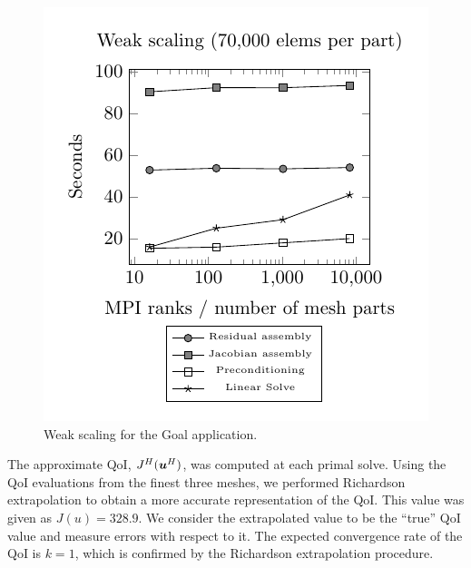 \begin{figure}[ht!]
\centering
\includegraphics[width=0.5\linewidth]{img/aut_weak_scaling.pdf}
\caption{Weak scaling for the Goal application.}
\label{fig:aut_weak_scaling}
\end{figure}

The approximate QoI, $J^H(\boldsymbol{u}^H)$, was computed at each
primal solve. Using the QoI evaluations from the finest three meshes,
we performed Richardson extrapolation \cite{richardson1911approximate}
to obtain a more accurate representation of the QoI.
This value was given as $J(u) = 328.9$. We consider the extrapolated
value to be the ``true'' QoI value and measure errors with respect
to it. The expected convergence rate of the QoI is $k=1$, which is
confirmed by the Richardson extrapolation procedure.

